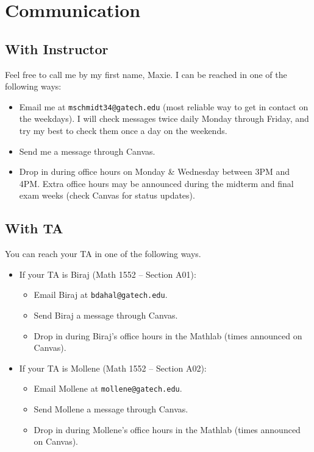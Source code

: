 \documentclass[11pt]{article}
\begin{document}
\section{Communication}

    \subsection{With Instructor}
    Feel free to call me by my first name, Maxie. I can be reached in one of the following ways:
    \begin{itemize}
        \item Email me at {\tt mschmidt34@gatech.edu} (most reliable way to get in contact on the weekdays). 
              I will check messages twice daily Monday through Friday, and try my best to check them once a day 
              on the weekends.
        \item Send me a message through Canvas.
        \item Drop in during office hours on 
              Monday \& Wednesday between 3PM and 4PM. Extra office hours may be announced during the midterm 
              and final exam weeks (check Canvas for status updates).
    \end{itemize}
    
    \subsection{With TA}
    You can reach your TA in one of the following ways.
    \begin{itemize}
        \item If your TA is Biraj (Math 1552 -- Section A01):
        \begin{itemize}
            \item Email Biraj at {\tt bdahal@gatech.edu}.
            \item Send Biraj a message through Canvas.
            \item Drop in during Biraj's office hours in the Mathlab (times announced on Canvas).
        \end{itemize}
        \item If your TA is Mollene (Math 1552 -- Section A02):
        \begin{itemize}
            \item Email Mollene at {\tt mollene@gatech.edu}.
            \item Send Mollene a message through Canvas.
            \item Drop in during Mollene's office hours in the Mathlab (times announced on Canvas). 
        \end{itemize}
    \end{itemize}
    
\end{document}
